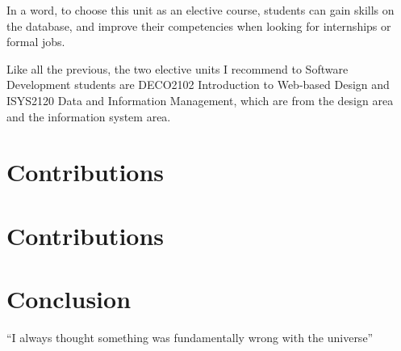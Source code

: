 \documentclass[12pt]{article}
\begin{document}
In a word, to choose this unit as an elective course, students can gain skills on the database, and improve their competencies when looking for internships or formal jobs.

Like all the previous, the two elective units I recommend to Software Development students are DECO2102 Introduction to Web-based Design and ISYS2120 Data and Information Management, which are from the design area and the information system area.


\newpage
\section{Contributions}

\newpage


\newpage
\section{Contributions}

\newpage
\section{Conclusion}
``I always thought something was fundamentally wrong with the universe\cite{Burridge_2018a}''
{}

% 






\end{document}
